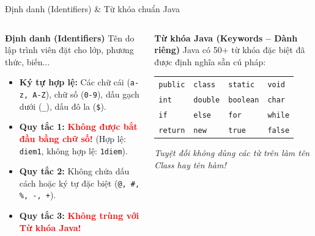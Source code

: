 \documentclass[aspectratio=169, 10pt]{beamer}
\begin{document}
\begin{frame}{Định danh (Identifiers) \& Từ khóa chuẩn Java}
  \begin{columns}[t]
    \begin{block}{\textbf{Định danh (Identifiers)}}
      Tên do lập trình viên đặt cho lớp, phương thức, biến...
      \begin{itemize}\small
        \item \textbf{Ký tự hợp lệ:} Các chữ cái (\texttt{a-z, A-Z}), chữ số (\texttt{0-9}), dấu gạch dưới (\texttt{\_}), dấu đô la (\texttt{\$}).
        \item \textbf{Quy tắc 1:} \textcolor{red}{\textbf{Không được bắt đầu bằng chữ số!}} (Hợp lệ: \texttt{diem1}, không hợp lệ: \texttt{1diem}).
        \item \textbf{Quy tắc 2:} Không chứa dấu cách hoặc ký tự đặc biệt (\texttt{@, \#, \%, -, +}).
        \item \textbf{Quy tắc 3:} \textcolor{red}{\textbf{Không trùng với Từ khóa Java!}}
      \end{itemize}
    \end{block}

    \begin{alertblock}{\textbf{Từ khóa Java (Keywords -- Dành riêng)}}
      Java có 50+ từ khóa đặc biệt đã được định nghĩa sẵn cú pháp:
      \vspace{2mm}
      \centering
      \footnotesize
      \begin{tabular}{llll}
        \texttt{public} & \texttt{class} & \texttt{static} & \texttt{void} \\
        \texttt{int}    & \texttt{double}& \texttt{boolean}& \texttt{char} \\
        \texttt{if}     & \texttt{else}  & \texttt{for}    & \texttt{while} \\
        \texttt{return} & \texttt{new}   & \texttt{true}   & \texttt{false} \\
      \end{tabular}
      \flushleft\vspace{2mm}
      \textit{Tuyệt đối không dùng các từ trên làm tên Class hay tên hàm!}
    \end{alertblock}
  \end{columns}
\end{frame}
\end{document}

